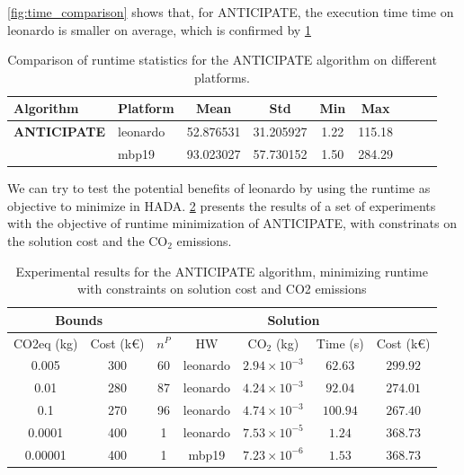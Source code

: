 \documentclass[a4paper,singleside,12pt]{report} %
\begin{document}
\ref{fig:time_comparison} shows that, for ANTICIPATE, the execution time time on leonardo is smaller on average, which is confirmed by \ref{tab:anticipate_runtime_comparison}

\begin{table}[h]
    \centering
    \begin{tabular}{llccccccc}
        \toprule
        \textbf{Algorithm} & \textbf{Platform} & \textbf{Mean} & \textbf{Std} & \textbf{Min} & \textbf{Max} \\
        \midrule
        \textbf{ANTICIPATE} & leonardo & 52.876531 & 31.205927 & 1.22 & 115.18 \\
                            & mbp19    & 93.023027 & 57.730152 & 1.50 & 284.29 \\
        \bottomrule
    \end{tabular}
    \caption{Comparison of runtime statistics for the ANTICIPATE algorithm on different platforms.}
    \label{tab:anticipate_runtime_comparison}
\end{table}

We can try to test the potential benefits of leonardo by using the runtime as objective to minimize in HADA. \ref{tab:anticipate_results_runtime} presents the results of a set of experiments 
with the objective of runtime minimization of ANTICIPATE, with constrinats on the solution cost and the CO$_2$ emissions.

\begin{table}[h!] 
    \centering
    \begin{tabular}{|cc|ccccc|}
        \hline
        \multicolumn{2}{|c|}{Bounds} & \multicolumn{5}{c|}{Solution} \\
        \hline
        CO2eq (kg) & Cost (k€) & $n^P$ & HW & CO$_2$ (kg) & Time (s) & Cost (k€) \\
        \hline
        0.005 & 300 & 60 & leonardo & $2.94 \times 10^{-3}$ & $62.63$ & $299.92$ \\
        0.01 & 280 & 87 & leonardo & $4.24 \times 10^{-3}$ & $92.04$ & $274.01$ \\
        0.1 & 270 & 96 & leonardo & $4.74 \times 10^{-3}$ & $100.94$ & $267.40$ \\
        0.0001 & 400 & 1 & leonardo & $7.53 \times 10^{-5}$ & $1.24$ & $368.73$ \\
        0.00001 & 400 & 1 & mbp19 & $7.23 \times 10^{-6}$ & $1.53$ & $368.73$ \\
        \hline
    \end{tabular}
    \caption{Experimental results for the ANTICIPATE algorithm, minimizing runtime with constraints on solution cost and CO2 emissions}
    \label{tab:anticipate_results_runtime}
\end{table}
\end{document}

